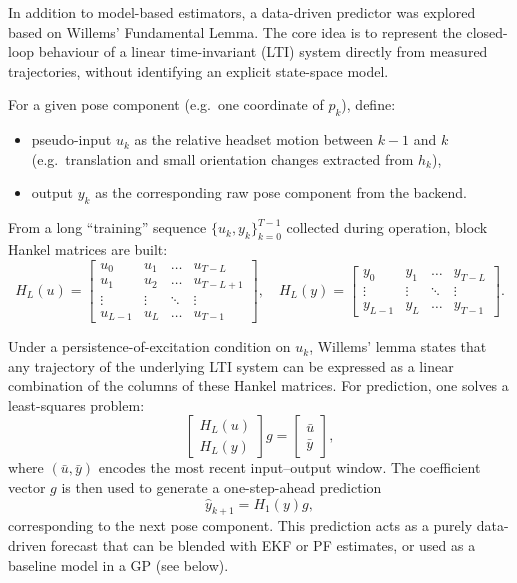 In addition to model-based estimators, a data-driven predictor was explored based on Willems’ Fundamental Lemma. The core idea is to represent the closed-loop behaviour of a linear time-invariant (LTI) system directly from measured trajectories, without identifying an explicit state-space model.

For a given pose component (e.g.\ one coordinate of $p_k$), define:
\begin{itemize}
    \item pseudo-input $u_k$ as the relative headset motion between $k-1$ and $k$ (e.g.\ translation and small orientation changes extracted from $h_k$),
    \item output $y_k$ as the corresponding raw pose component from the backend.
\end{itemize}

From a long “training” sequence $\{u_k, y_k\}_{k=0}^{T-1}$ collected during operation, block Hankel matrices are built:
\[
H_L(u) =
\begin{bmatrix}
u_0 & u_1 & \dots & u_{T-L} \\
u_1 & u_2 & \dots & u_{T-L+1} \\
\vdots & \vdots & \ddots & \vdots \\
u_{L-1} & u_L & \dots & u_{T-1}
\end{bmatrix},
\quad
H_L(y) =
\begin{bmatrix}
y_0 & y_1 & \dots & y_{T-L} \\
\vdots & \vdots & \ddots & \vdots \\
y_{L-1} & y_L & \dots & y_{T-1}
\end{bmatrix}.
\]

Under a persistence-of-excitation condition on $u_k$, Willems’ lemma states that any trajectory of the underlying LTI system can be expressed as a linear combination of the columns of these Hankel matrices. For prediction, one solves a least-squares problem:
\[
\begin{bmatrix}
H_L(u) \\
H_L(y)
\end{bmatrix} g
=
\begin{bmatrix}
\bar{u} \\
\bar{y}
\end{bmatrix},
\]
where $(\bar{u},\bar{y})$ encodes the most recent input–output window. The coefficient vector $g$ is then used to generate a one-step-ahead prediction
\[
\hat{y}_{k+1} = H_1(y) g,
\]
corresponding to the next pose component. This prediction acts as a purely data-driven forecast that can be blended with EKF or PF estimates, or used as a baseline model in a GP (see below).

